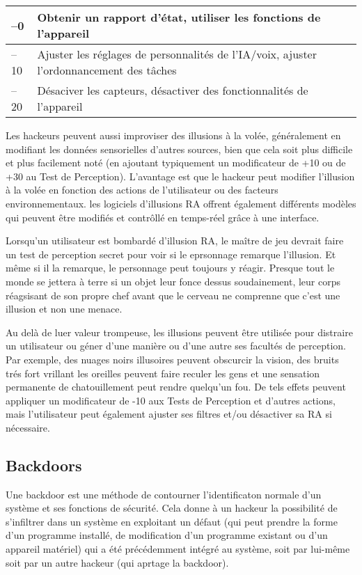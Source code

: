 \begin{table}
\begin{tabularx}{\textwidth}{|l|X|}
–0 &Obtenir un rapport d'état, utiliser les fonctions de l'appareil\\ \hline

–10 &Ajuster les réglages de personnalités de l'IA/voix, ajuster l'ordonnancement des tâches \\ \hline

–20 &Désaciver les capteurs, désactiver des fonctionnalités de l'appareil\\ \hline

\end{tabularx} \end{table} 

Les hackeurs peuvent aussi improviser des illusions à la volée, généralement en modifiant les données sensorielles d'autres sources, bien que cela soit plus difficile et plus facilement noté (en ajoutant typiquement un modificateur de +10 ou de +30 au Test de Perception). L'avantage est que le hackeur peut modifier l'illusion à la volée en fonction des actions de l'utilisateur ou des facteurs environnementaux. les logiciels d'illusions RA offrent également différents modèles qui peuvent être modifiés et contrôllé en temps-réel grâce à une interface. 

Lorsqu'un utilisateur est bombardé d'illusion RA, le maître de jeu devrait faire un test de perception secret pour voir si le eprsonnage remarque l'illusion. Et même si il la remarque, le personnage peut toujours y réagir. Presque tout le monde se jettera à terre si un objet leur fonce dessus soudainement, leur corps réagsisant de son propre chef avant que le cerveau ne comprenne que c'est une illusion et non une menace. 

Au delà de luer valeur trompeuse, les illusions peuvent être utilisée pour distraire un utilisateur ou géner d'une manière ou d'une autre ses facultés de perception. Par exemple, des nuages noirs illusoires peuvent obscurcir la vision, des bruits trés fort vrillant les oreilles peuvent faire reculer les gens et une sensation permanente de chatouillement peut rendre quelqu'un fou. De tels effets peuvent appliquer un modificateur de -10 aux Tests de Perception et d'autres actions, mais l'utilisateur peut également ajuster ses filtres et/ou désactiver sa RA si nécessaire. 

\subsection{Backdoors} 

Une backdoor est une méthode de contourner l'identificaton normale d'un système et ses fonctions de sécurité. Cela donne à un hackeur la possibilité de s'infiltrer dans un système en exploitant un défaut (qui peut prendre la forme d'un programme installé, de modification d'un programme existant ou d'un appareil matériel) qui a été précédemment intégré au système, soit par lui-même soit par un autre hackeur (qui aprtage la backdoor). 

